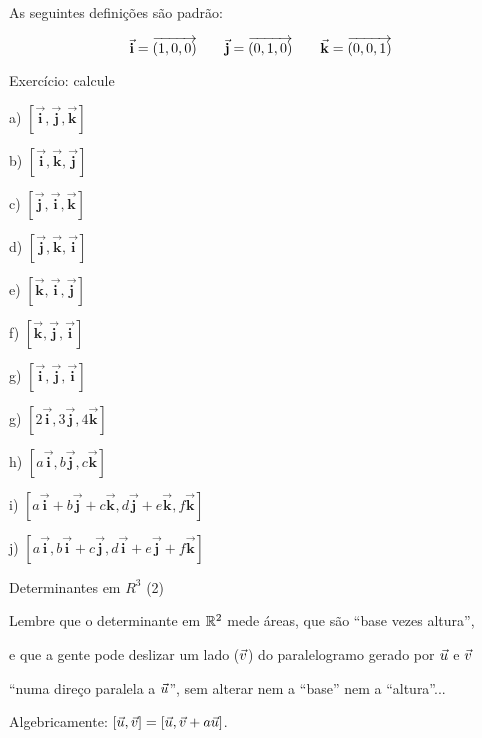 \documentclass[oneside]{book}
\begin{document}
\def\ii{\vec{\mathbf{i}}}
\def\jj{\vec{\mathbf{j}}}
\def\kk{\vec{\mathbf{k}}}

As seguintes definições são padrão:

$$\ii=\V(1,0,0) \qquad \jj=\V(0,1,0) \qquad \kk=\V(0,0,1)$$

Exercício: calcule

a) $[\ii,\jj,\kk]$

b) $[\ii,\kk,\jj]$

c) $[\jj,\ii,\kk]$

d) $[\jj,\kk,\ii]$

e) $[\kk,\ii,\jj]$

f) $[\kk,\jj,\ii]$

g) $[\ii,\jj,\ii]$

g) $[2\ii,3\jj,4\kk]$

h) $[a\ii,b\jj,c\kk]$

i) $[a\ii+b\jj+c\kk,d\jj+e\kk,f\kk]$

j) $[a\ii, b\ii+c\jj, d\ii+e\jj+f\kk]$




\newpage


 {Determinantes em $R^3$ (2)}

\ssk

Lembre que o determinante em $\mathbb{R}^2$ mede áreas, que são ``base vezes altura'',

e que a gente pode deslizar um lado (${\vec v}$) do paralelogramo gerado por ${\vec u}$ e ${\vec v}$

``numa direço paralela a ${\vec u}$'', sem alterar nem a ``base'' nem a ``altura''...

Algebricamente: $[{\vec u},{\vec v}] = [{\vec u},{\vec v}+a{\vec u}]$.
\end{document}
